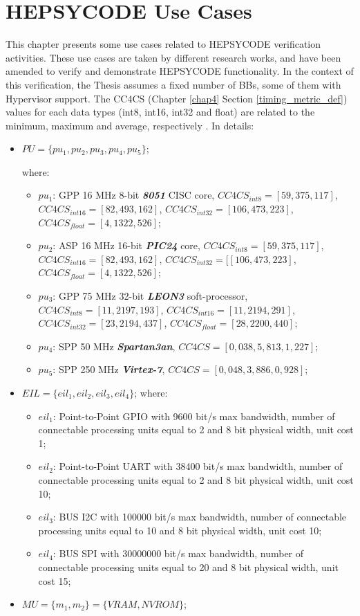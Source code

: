 \chapter{HEPSYCODE Use Cases}  %
%
This chapter presents some use cases related to HEPSYCODE verification activities. 
 These use cases are taken by different research works, and have been amended to verify and demonstrate HEPSYCODE functionality. In the context of this verification, the Thesis assumes a fixed number of BBs, some of them with Hypervisor support. The CC4CS (Chapter \ref{chap4} Section \ref{timing_metric_def}) values for each data types (int8, int16, int32 and float) are related to the minimum, maximum and average, respectively \cite{bib25}. In details:
%
\begin{itemize}
    \item $PU = \{pu_1, pu_2, pu_3, pu_4, pu_5 \}$; \par
    where:
    \begin{itemize}
        \item $pu_1$: GPP 16 MHz 8-bit \textit{\textbf{8051}} CISC core, $CC4CS_{int8}=[59, 375, 117]$, $CC4CS_{int16}=[82, 493, 162]$, $CC4CS_{int32}=[106, 473, 223]$, $CC4CS_{float}=[4, 1322, 526]$;
        \item $pu_2$: ASP 16 MHz 16-bit \textit{\textbf{PIC24}} core,  $CC4CS_{int8}=[59, 375, 117]$, $CC4CS_{int16}=[82, 493, 162]$, $CC4CS_{int32}=[[106, 473, 223]$, $CC4CS_{float}=[4, 1322, 526]$;  
        \item $pu_3$: GPP 75 MHz 32-bit \textit{\textbf{LEON3}} soft-processor, $CC4CS_{int8}=[11, 2197, 193]$, $CC4CS_{int16}=[11, 2194, 291]$, $CC4CS_{int32}=[23, 2194, 437]$, $CC4CS_{float}=[28, 2200, 440]$;
        \item $pu_4$: SPP 50 MHz \textit{\textbf{Spartan3an}}, $CC4CS=[0,038, 5,813, 1,227]$;
        \item $pu_5$: SPP 250 MHz \textit{\textbf{Virtex-7}}, $CC4CS=[0,048, 3,886, 0,928]$;
    \end{itemize}
    \item $EIL = \{ eil_1, eil_2, eil_3, eil_4 \}$;
     where:
    \begin{itemize}
        \item $eil_1$: Point-to-Point GPIO with 9600 bit/s max bandwidth, number of connectable processing units equal to 2 and 8 bit physical width, unit cost 1;
        \item $eil_2$: Point-to-Point UART with 38400 bit/s max bandwidth, number of connectable processing units equal to 2 and 8 bit physical width, unit cost 10;
        \item $eil_3$: BUS I2C with 100000 bit/s max bandwidth, number of connectable processing units equal to 10 and 8 bit physical width, unit cost 10;
        \item $eil_4$: BUS SPI with 30000000 bit/s max bandwidth, number of connectable processing units equal to 20 and 8 bit physical width, unit cost 15;
    \end{itemize}
    \item $MU = \{m_1, m_2\} = \{V RAM, NV ROM\}$;
\end{itemize}
